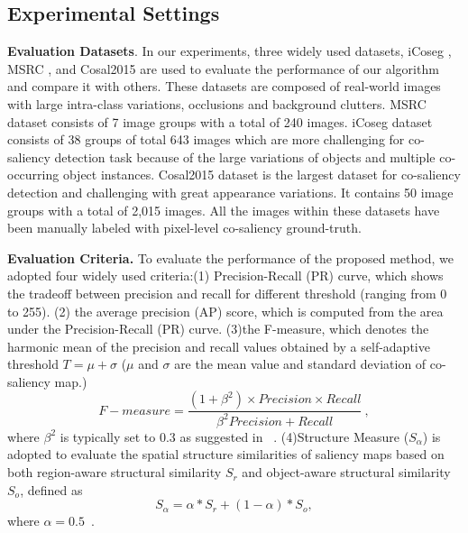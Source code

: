 \documentclass[sigconf]{acmart}
\begin{document}
\subsection{Experimental Settings }
\textbf{Evaluation Datasets}. In our experiments, three widely used datasets, iCoseg \cite{DBLP:conf/cvpr/BatraKPLC10},  MSRC \cite{DBLP:conf/iccv/WinnCM05}, and Cosal2015 \cite{DBLP:journals/ijcv/ZhangHLWL16} are used to evaluate the performance of our algorithm and compare it with others. These datasets are composed of real-world images with large intra-class variations, occlusions and background clutters. MSRC dataset consists of 7 image groups with a total of 240 images. iCoseg dataset consists of 38 groups of total 643 images which are more challenging for co-saliency detection task because of the large variations of objects and multiple co-occurring object instances. Cosal2015 dataset is the largest  dataset for co-saliency detection and challenging  with great appearance variations. It contains 50 image groups with a total of 2,015 images. All the images within these datasets have been manually labeled with pixel-level co-saliency ground-truth.

\noindent \textbf{Evaluation Criteria. }To evaluate the performance of the proposed method, we adopted four widely used criteria:(1) Precision-Recall (PR) curve, which shows the tradeoff between precision and recall for different threshold (ranging from 0 to 255). (2) the average precision (AP) score, which is computed from the area under the Precision-Recall (PR) curve. (3)the F-measure, which denotes the harmonic mean of the precision and recall values obtained by a self-adaptive threshold $T = \mu +\sigma$ ($\mu$ and $\sigma$ are the mean value and standard deviation of co-saliency map.)
\begin{equation}
    F-measure = \frac{(1+\beta^{2})\times Precision \times Recall}{\beta^{2}Precision+Recall }~,
\end{equation}
where $\beta^{2}$ is typically set to 0.3 as suggested in ~\cite{DBLP:journals/tcsv/HanCLZ18,DBLP:conf/cvpr/YangZLRY13}. (4)Structure Measure ($S_{\alpha}$) is adopted to evaluate the spatial structure similarities of saliency maps based on both region-aware structural similarity $S_{r}$ and object-aware structural similarity $S_{o}$, defined as
\begin{equation}
    S_{\alpha} = \alpha \ast S_{r} + (1- \alpha) \ast S_{o},
\end{equation}
 where $\alpha = 0.5$~\cite{DBLP:conf/iccv/FanCLLB17}.
 
\end{document}
